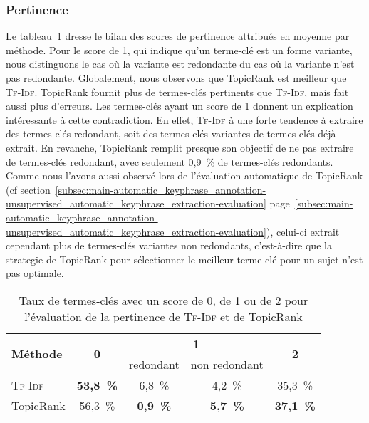       \subsubsection{Pertinence}
      \label{subsubsec:main-automatic_evaluation_of_keyphrase_annotation-results-topicrank-pertinence}
        Le
        tableau~\ref{tab:main-automatic_evaluation_of_keyphrase_annotation-results-topicrank-pertinence_score_ratio}
        dresse le bilan des scores de pertinence attribués en moyenne par
        méthode. Pour le score de 1, qui indique qu'un terme-clé est un forme
        variante, nous distinguons le cas où la variante est redondante du cas
        où la variante n'est pas redondante. Globalement, nous observons que
        TopicRank est meilleur que \textsc{Tf-Idf}. TopicRank fournit plus de
        termes-clés pertinents que \textsc{Tf-Idf}, mais fait aussi plus
        d'erreurs. Les termes-clés ayant un score de 1 donnent un explication
        intéressante à cette contradiction. En effet, \textsc{Tf-Idf} à une
        forte tendence à extraire des termes-clés redondant, soit des
        termes-clés variantes de termes-clés déjà extrait. En revanche,
        TopicRank remplit presque son objectif de ne pas extraire de termes-clés
        redondant, avec seulement 0,9~\% de termes-clés redondants. Comme nous
        l'avons aussi observé lors de l'évaluation automatique de TopicRank (cf
        section~\ref{subsec:main-automatic_keyphrase_annotation-unsupervised_automatic_keyphrase_extraction-evaluation}
        page~\ref{subsec:main-automatic_keyphrase_annotation-unsupervised_automatic_keyphrase_extraction-evaluation}),
        celui-ci extrait cependant plus de termes-clés variantes non redondants,
        c'est-à-dire que la strategie de TopicRank pour sélectionner le meilleur
        terme-clé pour un sujet n'est pas optimale.
        \begin{table}[h!]
          \centering
          \begin{tabular}{l|c|c|c|c}
            \toprule
            \multirow{2}{*}{\textbf{Méthode}} & \multirow{2}{*}{\textbf{0}} & \multicolumn{2}{c|}{\textbf{1}} & \multirow{2}{*}{\textbf{2}}\\
            \cline{3-4}
            & & \multicolumn{1}{p{.175\linewidth}|}{\centering{}redondant} & \multicolumn{1}{p{.175\linewidth}|}{\centering{}non redondant} &\\
            \hline
            \textsc{Tf-Idf} & \textbf{53,8~\%} & 6,8~\% & 4,2~\% & 35,3~\%\\
            TopicRank & 56,3~\% & \textbf{0,9~\%} & \textbf{5,7~\%} & \textbf{37,1~\%}\\
            \bottomrule
          \end{tabular}
          \caption{Taux de termes-clés avec un score de 0, de 1 ou de 2 pour
                   l'évaluation de la pertinence de \textsc{Tf-Idf} et de
                   TopicRank
                   \label{tab:main-automatic_evaluation_of_keyphrase_annotation-results-topicrank-pertinence_score_ratio}}
        \end{table}

